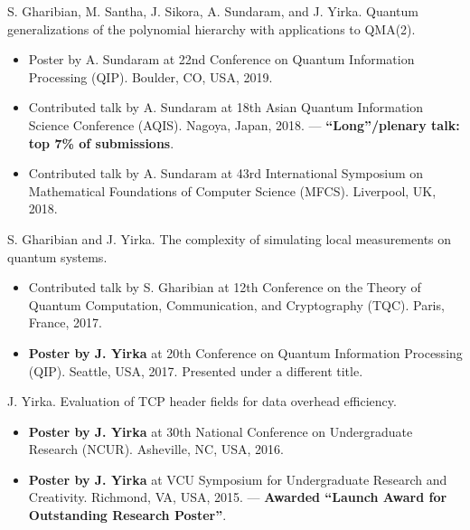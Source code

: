 \documentclass[11pt,letterpaper,serif]{moderncv}
\newcommand{\pubItemSep}{0.3em}
\begin{document}
S. Gharibian, M. Santha, J. Sikora, A. Sundaram, and J. Yirka. Quantum generalizations of the polynomial hierarchy with applications to QMA(2).
\begin{adjustwidth}{.25in}{} 
	\begin{itemize}[itemsep=\pubItemSep]
		\item Poster by A. Sundaram at 22nd Conference on Quantum Information Processing (QIP). Boulder, CO, USA, 2019.
		\item Contributed talk by A. Sundaram at 18th Asian Quantum Information Science Conference (AQIS). Nagoya, Japan, 2018. --- \textbf{``Long''/plenary talk: top 7\% of submissions}.
		\item Contributed talk by A. Sundaram at 43rd International	Symposium on Mathematical Foundations of Computer Science (MFCS). Liverpool, UK, 2018.
	\end{itemize}
\end{adjustwidth}

S. Gharibian and J. Yirka. The complexity of simulating local measurements on quantum systems.
\begin{adjustwidth}{.25in}{}
	\begin{itemize}[itemsep=\pubItemSep]
		\item Contributed talk by S. Gharibian at 12th Conference on the Theory of Quantum Computation, Communication,
		and Cryptography (TQC). Paris, France, 2017.
		\item \textbf{Poster by J. Yirka} at 20th Conference on Quantum Information Processing (QIP). Seattle, USA, 2017. Presented under a different title.
	\end{itemize}
\end{adjustwidth}

J. Yirka. Evaluation of TCP header fields for data overhead efficiency.
\begin{adjustwidth}{.25in}{}
	\begin{itemize}[itemsep=\pubItemSep]
		\item \textbf{Poster by J. Yirka} at 30th National Conference on Undergraduate Research (NCUR). Asheville, NC, USA, 2016.
		\item \textbf{Poster by J. Yirka} at VCU Symposium for Undergraduate Research and Creativity. Richmond, VA, USA, 2015. --- \textbf{Awarded ``Launch Award for Outstanding Research Poster''}.	
	\end{itemize}
\end{adjustwidth}


\end{document}
